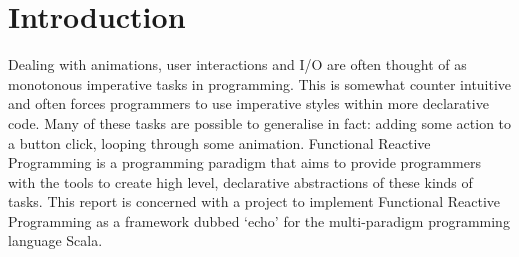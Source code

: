 \chapter{Introduction}

Dealing with animations, user interactions and I/O are often thought of as monotonous imperative tasks
in programming. This is somewhat counter intuitive and often forces programmers to use imperative
styles within more declarative code. Many of these tasks are possible to generalise in fact: adding
some action to a button click, looping through some animation. Functional Reactive Programming
is a programming paradigm that aims to provide programmers with the tools to create high level,
declarative abstractions of these kinds of tasks. This report is concerned with a project to
implement Functional Reactive Programming as a framework dubbed `echo' for the multi-paradigm programming language
Scala.